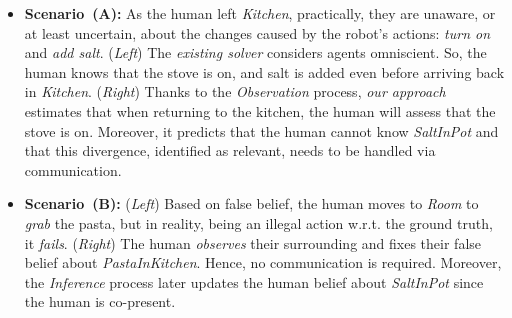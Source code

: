 \documentclass[letterpaper]{article} %
\begin{document}
\begin{itemize}
    \item \textbf{Scenario~(A):} 
    As the human left {\em Kitchen}, practically, they are unaware, or at least uncertain, about the changes caused by the robot's actions: {\em turn on} and {\em add salt}. (\textit{Left}) The \textit{existing solver} considers agents omniscient. So, the human knows that the stove is {\sc on}, and salt is added even before arriving back in {\em Kitchen}. (\textit{Right}) Thanks to the \textit{Observation} process, \textit{our approach} estimates that when returning to the kitchen, the human will assess that the stove is {\sc on}. Moreover, it predicts that the human cannot know \textit{SaltInPot} and that this divergence, identified as relevant, needs to be handled via communication.
    \item \textbf{Scenario~(B):}
    (\textit{Left}) Based on false belief, the human moves to \textit{Room} to \textit{grab} the pasta, but in reality, being an illegal action w.r.t. the ground truth, it \textit{fails}. 
    (\textit{Right}) The human \textit{observes} their surrounding and fixes their false belief about \textit{PastaInKitchen}. Hence, no communication is required. Moreover, the \textit{Inference} process later updates the human belief about \textit{SaltInPot} since the human is co-present.
\end{itemize} 
\end{document}
